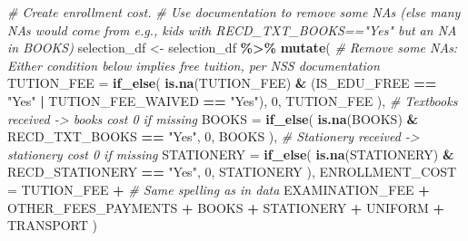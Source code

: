 \documentclass[
]{article}
\newenvironment{Shaded}{\begin{snugshade}}{\end{snugshade}}
\newcommand{\AttributeTok}[1]{\textcolor[rgb]{0.13,0.29,0.53}{#1}}
\newcommand{\CommentTok}[1]{\textcolor[rgb]{0.56,0.35,0.01}{\textit{#1}}}
\newcommand{\DecValTok}[1]{\textcolor[rgb]{0.00,0.00,0.81}{#1}}
\newcommand{\FunctionTok}[1]{\textcolor[rgb]{0.13,0.29,0.53}{\textbf{#1}}}
\newcommand{\NormalTok}[1]{#1}
\newcommand{\OtherTok}[1]{\textcolor[rgb]{0.56,0.35,0.01}{#1}}
\newcommand{\SpecialCharTok}[1]{\textcolor[rgb]{0.81,0.36,0.00}{\textbf{#1}}}
\newcommand{\StringTok}[1]{\textcolor[rgb]{0.31,0.60,0.02}{#1}}
\begin{document}
\begin{Shaded}
\begin{Highlighting}[]
\CommentTok{\# Create enrollment cost. }
\CommentTok{\# Use documentation to remove some NAs (else many NAs would come from e.g., kids with RECD\_TXT\_BOOKS=="Yes" but an NA in BOOKS)}
\NormalTok{selection\_df }\OtherTok{\textless{}{-}}\NormalTok{ selection\_df }\SpecialCharTok{\%\textgreater{}\%} 
  \FunctionTok{mutate}\NormalTok{(}
    \CommentTok{\# Remove some NAs: Either condition below implies free tuition, per NSS documentation}
    \AttributeTok{TUTION\_FEE =} \FunctionTok{if\_else}\NormalTok{(}
      \FunctionTok{is.na}\NormalTok{(TUTION\_FEE) }\SpecialCharTok{\&}\NormalTok{ (IS\_EDU\_FREE }\SpecialCharTok{==} \StringTok{"Yes"} \SpecialCharTok{|}\NormalTok{ TUTION\_FEE\_WAIVED }\SpecialCharTok{==} \StringTok{"Yes"}\NormalTok{), }
      \DecValTok{0}\NormalTok{, TUTION\_FEE}
\NormalTok{      ),}
    \CommentTok{\# Textbooks received {-}\textgreater{} books cost 0 if missing}
    \AttributeTok{BOOKS =} \FunctionTok{if\_else}\NormalTok{(}
      \FunctionTok{is.na}\NormalTok{(BOOKS) }\SpecialCharTok{\&}\NormalTok{ RECD\_TXT\_BOOKS }\SpecialCharTok{==} \StringTok{"Yes"}\NormalTok{,}
      \DecValTok{0}\NormalTok{, BOOKS}
\NormalTok{      ),}
    \CommentTok{\# Stationery received {-}\textgreater{} stationery cost 0 if missing}
    \AttributeTok{STATIONERY =} \FunctionTok{if\_else}\NormalTok{(}
      \FunctionTok{is.na}\NormalTok{(STATIONERY) }\SpecialCharTok{\&}\NormalTok{ RECD\_STATIONERY }\SpecialCharTok{==} \StringTok{"Yes"}\NormalTok{,}
      \DecValTok{0}\NormalTok{, STATIONERY}
\NormalTok{      ),}
    \AttributeTok{ENROLLMENT\_COST =}\NormalTok{ TUTION\_FEE }\SpecialCharTok{+} \CommentTok{\# Same spelling as in data}
\NormalTok{                      EXAMINATION\_FEE }\SpecialCharTok{+}
\NormalTok{                      OTHER\_FEES\_PAYMENTS }\SpecialCharTok{+}
\NormalTok{                      BOOKS }\SpecialCharTok{+}
\NormalTok{                      STATIONERY }\SpecialCharTok{+}
\NormalTok{                      UNIFORM }\SpecialCharTok{+}
\NormalTok{                      TRANSPORT}
\NormalTok{  )}




\end{Highlighting}
\end{Shaded}
\end{document}

